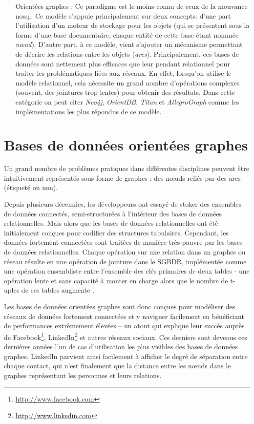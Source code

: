 \begin{itemize}
  \item [Orientées graphes]: Ce paradigme est le moins connu de ceux
    de la mouvance \acrshort{nosql}. Ce modèle s'appuie principalement
    sur deux concepts: d'une part l'utilisation d'un moteur de
    stockage pour les objets (qui se présentent sous la forme d'une
    base documentaire, chaque entité de cette base étant nommée
    \emph{nœud}). D'autre part, à ce modèle, vient s'ajouter un
    mécanisme permettant de décrire les relations entre les objets
    (\emph{arcs}). Principalement, ces bases de données sont nettement
    plus efficaces que leur pendant relationnel pour traiter les
    problématiques liées aux réseaux.  En effet, lorsqu'on utilise le
    modèle relationnel, cela nécessite un grand nombre d'opérations
    complexes (souvent, des jointures trop lentes) pour obtenir des
    résultats. Dans cette catégorie on peut citer \emph{Neo4j},
    \emph{OrientDB}, \emph{Titan} et \emph{AllegroGraph} comme les
    implémentations les plus répondus de ce modèle.
  \end{itemize}

  

\section{Bases de données orientées graphes}
\label{sec:graph-database-overview}
\begin{text}
  Un grand nombre de problèmes pratiques dans différentes disciplines
  peuvent être intuitivement représentés sous forme de graphes : des
  nœuds reliés par des arcs (étiqueté ou non).

  Depuis plusieurs décennies, les développeurs ont essayé de stoker
  des ensembles de données connectés, semi-structurées à l'intérieur
  des bases de données relationnelles. Mais alors que les bases de
  données relationnelles ont été initialement conçues pour codifier
  des structures tabulaires. Cependant, les données fortement
  connectées sont traitées de manière très pauvre par les bases de
  données relationnelles. Chaque opération sur une relation dans un
  graphes ou réseau résulte en une opération de jointure dans le
  \acrshort{SGBDR}, implémentée comme une opération ensembliste entre
  l'ensemble des clés primaires de deux tables - une opération lente
  et sans capacité à monter en charge alors que le nombre de t-uples
  de ces tables augmente \cite{robinson2013graph}.

  Les bases de données orientées graphes sont donc conçues pour
  modéliser des réseaux de données fortement connectées et y naviguer
  facilement en bénéficiant de performances extrêmement élevées – un
  atout qui explique leur succès auprès de
  Facebook\footnote{\url{http://www.facebook.com}},
  LinkedIn\footnote{\url{http://www.linkedin.com}} et autres réseaux
  sociaux. Ces derniers sont devenus ces dernières années l'un de cas
  d'utilisation les plus visibles des bases de données graphes.
  LinkedIn parvient ainsi facilement à afficher le degré de séparation
  entre chaque contact, qui n'est finalement que la distance entre les
  nœuds dans le graphes représentant les personnes et leurs relations.
\end{text}


